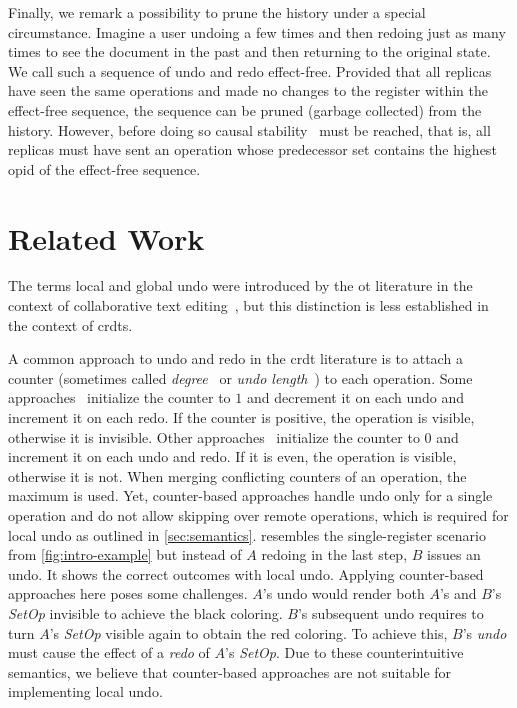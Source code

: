 \documentclass[sigplan]{acmart}
\newcommand{\setopkind}{\textit{SetOp}}
\begin{document}
Finally, we remark a possibility to prune the history under a special circumstance.
Imagine a user undoing a few times and then redoing just as many times
to see the document in the past and then returning to the original state.
We call such a sequence of undo and redo effect-free.
Provided that all replicas have seen the same operations and made no
changes to the register within the effect-free sequence,
the sequence can be pruned (garbage collected) from the history.
However, before doing so causal stability~\cite{baquero2017pure}
must be reached, that is, all
replicas must have sent an operation whose predecessor set contains the
highest \gls*{opid} of the effect-free sequence.

\section{Related Work}\label{sec:related-work}

The terms local and global undo were introduced by the \acrlong{ot}
literature in the context of collaborative text
editing~\cite{sun2000undo,ressel1999reducing, abowd1992giving},
but this distinction is less established in the context of \glspl{crdt}.

A common approach to undo and redo in the \gls{crdt} literature is
to attach a counter
(sometimes called \emph{degree}~\cite{Weiss2010LogootUndo} or
\emph{undo length}~\cite{Brattli2021undo,Yu2019undo}) to each operation.
Some approaches~\cite{Weiss2010LogootUndo,Martin2010xml} initialize the
counter to $1$ and decrement it on each undo and increment it on each redo.
If the counter is positive, the operation is visible,
otherwise it is invisible.
Other approaches~\cite{Brattli2021undo,Yu2019undo} initialize the counter
to $0$ and increment it on each undo and redo.
If it is even, the operation is visible, otherwise it is not.
When merging conflicting counters of an operation, the maximum is used.
Yet, counter-based approaches handle undo only for a single operation
and do not allow skipping over remote operations, which is required
for local undo as outlined in \cref{sec:semantics}.
 resembles the single-register scenario from
\cref{fig:intro-example} but instead of $A$ redoing in the last step,
$B$ issues an undo. It shows the correct outcomes with local undo.
Applying counter-based approaches here poses some challenges.
$A$'s undo would render both $A$'s and $B$'s \setopkind{} invisible to
achieve the black coloring.
$B$'s subsequent undo requires to turn $A$'s \setopkind{} visible again to
obtain the red coloring.
To achieve this, $B$'s \emph{undo} must cause the effect of a \emph{redo}
of $A$'s \setopkind{}.
Due to these counterintuitive semantics,
we believe that counter-based approaches are not suitable
for implementing local undo.
\end{document}
